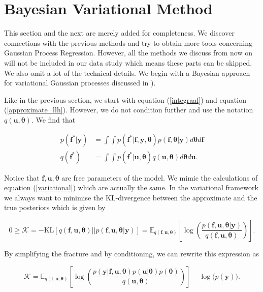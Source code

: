 \documentclass[12pt,a4paper,oneside]{book}
\begin{document}
\section{Bayesian Variational Method}\label{advanced}

This section and the next  are merely added for completeness. We discover connections with the previous methods and try to obtain more tools concerning Gaussian Process Regression. However, all the methods we discuss from now on will not be included in our data study which means these parts can be skipped. We also omit a lot of the technical details. We begin with a Bayesian approach for variational Gaussian processes discussed in \cite{hensman2015mcmc}). 

Like in the previous section, we start with equation (\ref{integraal})
and equation (\ref{approximate_llh}). However, we do not condition further and use the notation $q(\bm{u}, \bm{\theta})$. We find that

\begin{align}
p(\bm{f}^{\ast} | \bm{y} ) &= \int \int p(\bm{f}^{\ast} | \bm{f}, \bm{y} ,  \bm{\theta}) p(\bm{f} ,  \bm{\theta}| \bm{y} )  d\bm{\theta}d \bm{f} \\
q(\bm{f}^{\ast}) &= \int \int p(\bm{f}^{\ast} | \bm{u}, \bm{\theta}) q(\bm{u} ,  \bm{\theta} ) d \bm{\theta} d \bm{u}.
\end{align}

Notice that $\bm{f}, \bm{u}, \bm{\theta}$ are free parameters of the model. We mimic the calculations of equation (\ref{variational}) which are actually the same. In the variational framework we always want to minimise the KL-divergence between the approximate and the true posteriors which is given by

\begin{equation}
0 \geq \mathcal{K} = -\text{KL} [q(\bm{f}, \bm{u}, \bm{\theta}) || p(\bm{f}, \bm{u}, \bm{\theta} |\bm{y} )] = \mathbb{E}_{q( \bm{f}, \bm{u}, \bm{\theta}) } \left[  \log \left( \dfrac{p(\bm{f}, \bm{u}, \bm{\theta}| \bm{y})}{ q(\bm{f}, \bm{u}, \bm{\theta})}\right) \right] .
\end{equation}

By simplifying the fracture and by conditioning, we can rewrite this expression as

\begin{equation}
\mathcal{K} = \mathbb{E}_{q( \bm{f}, \bm{u}, \bm{\theta}) } \left[ \log \left( \dfrac{ p(\bm{y}|\bm{f}, \bm{u}, \bm{\theta}) p(\bm{u}|\bm{\theta}) p(\bm{\theta})}{q(\bm{u}, \bm{\theta})} \right)  \right] - \log{ (p(\bm{y})}).
\end{equation}
\end{document}

